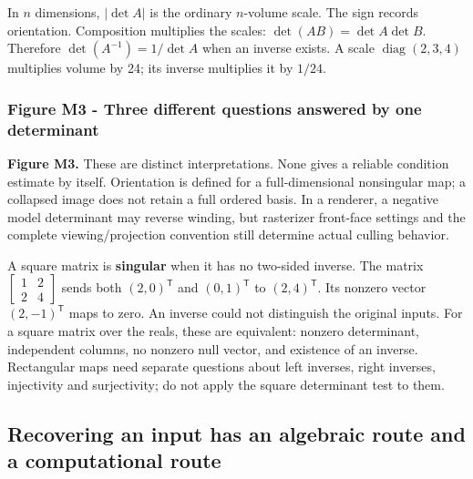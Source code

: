 In \(n\) dimensions, \(|\det A|\) is the ordinary \(n\)-volume scale. The sign records orientation. Composition multiplies the scales: \(\det(AB)=\det A\det B\). Therefore \(\det(A^{-1})=1/\det A\) when an inverse exists. A scale \(\operatorname{diag}(2,3,4)\) multiplies volume by 24; its inverse multiplies it by \(1/24\).

\subsubsection{Figure M3 - Three different questions answered by one determinant}\label{01-foundations-i-ch018-figure-m3---three-different-questions-answered-by-one-determinant}

\hypertarget{01-foundations-i-ch018-figure-m3---three-different-questions-answered-by-one-determinant}{}


\textbf{Figure M3.} These are distinct interpretations. None gives a reliable condition estimate by itself. Orientation is defined for a full-dimensional nonsingular map; a collapsed image does not retain a full ordered basis. In a renderer, a negative model determinant may reverse winding, but rasterizer front-face settings and the complete viewing/projection convention still determine actual culling behavior.

A square matrix is \textbf{singular} when it has no two-sided inverse. The matrix \(\begin{bmatrix}1&2\\2&4\end{bmatrix}\) sends both \((2,0)^{\mathsf T}\) and \((0,1)^{\mathsf T}\) to \((2,4)^{\mathsf T}\). Its nonzero vector \((2,-1)^{\mathsf T}\) maps to zero. An inverse could not distinguish the original inputs. For a square matrix over the reals, these are equivalent: nonzero determinant, independent columns, no nonzero null vector, and existence of an inverse. Rectangular maps need separate questions about left inverses, right inverses, injectivity and surjectivity; do not apply the square determinant test to them.

\subsection{Recovering an input has an algebraic route and a computational route}\label{01-foundations-i-ch018-recovering-an-input-has-an-algebraic-route-and-a-computational-route}

